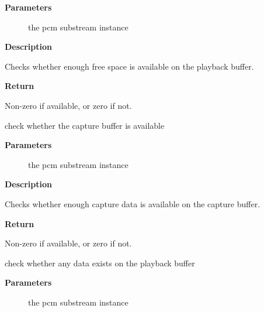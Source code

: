 \documentclass[a4paper,8pt,english]{sphinxmanual}
\begin{document}
\textbf{Parameters}
\begin{description}
\item[{}] \leavevmode
the pcm substream instance

\end{description}

\textbf{Description}

Checks whether enough free space is available on the playback buffer.

\textbf{Return}

Non-zero if available, or zero if not.

\begin{fulllineitems}
\label{sound/kernel-api/alsa-driver-api:c.snd_pcm_capture_ready}
check whether the capture buffer is available

\end{fulllineitems}


\textbf{Parameters}
\begin{description}
\item[{}] \leavevmode
the pcm substream instance

\end{description}

\textbf{Description}

Checks whether enough capture data is available on the capture buffer.

\textbf{Return}

Non-zero if available, or zero if not.

\begin{fulllineitems}
\label{sound/kernel-api/alsa-driver-api:c.snd_pcm_playback_data}
check whether any data exists on the playback buffer

\end{fulllineitems}


\textbf{Parameters}
\begin{description}
\item[{}] \leavevmode
the pcm substream instance

\end{description}
\end{document}
